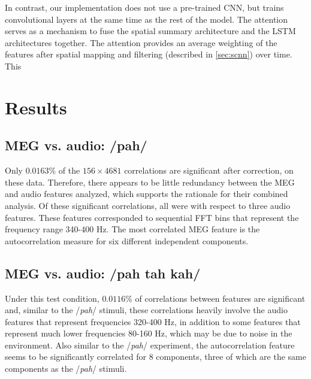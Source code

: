 \documentclass[utf8]{frontiersSCNS} %
\begin{document}
In contrast, our implementation does not use a pre-trained CNN, but trains convolutional layers at the same time as the rest of the model. The attention serves as a mechanism to fuse the spatial summary architecture and the LSTM architectures together. The attention provides an average weighting of the features after spatial mapping and filtering (described in \ref{sec:scnn}) over time. This 

\section{Results}

\subsection{MEG vs. audio: /pah/}

Only $0.0163$\% of the $156 \times 4681$ correlations are significant after correction, on these data. Therefore, there appears to be little redundancy between the MEG and audio features analyzed, which supports the rationale for their combined analysis. Of these significant correlations, all were with respect to three audio features. These features corresponded to sequential FFT bins that represent the frequency range 340-400 Hz. The most correlated MEG feature is the autocorrelation measure for six different independent components.

\subsection{MEG vs. audio: /pah tah kah/}

Under this test condition, $0.0116$\% of correlations between features are significant and, similar to the /{\em pah}/ stimuli, these correlations heavily involve the audio features that represent frequencies 320-400 Hz, in addition to some features that represent much lower frequencies 80-160 Hz, which may be due to noise in the environment. Also similar to the /{\em pah}/ experiment, the autocorrelation feature seems to be significantly correlated for 8 components, three of which are the same components as the /{\em pah}/ stimuli.

\end{document}
